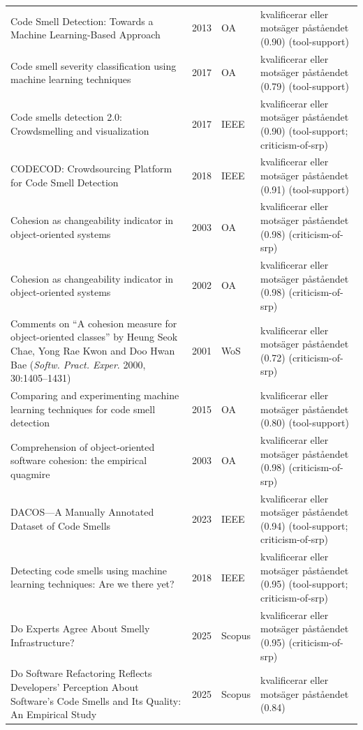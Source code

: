 \begin{longtable}{@{}%
  >{\raggedright\arraybackslash}p{}c%
  >{\raggedright\arraybackslash}p{}%
  >{\raggedright\arraybackslash}p{}@{}}
Code Smell Detection: Towards a Machine Learning-Based Approach & 2013 & OA & kvalificerar eller motsäger påståendet (0.90) (tool-support) \\
Code smell severity classification using machine learning techniques & 2017 & OA & kvalificerar eller motsäger påståendet (0.79) (tool-support) \\
Code smells detection 2.0: Crowdsmelling and visualization & 2017 & IEEE & kvalificerar eller motsäger påståendet (0.90) (tool-support; criticism-of-srp) \\
CODECOD: Crowdsourcing Platform for Code Smell Detection & 2018 & IEEE & kvalificerar eller motsäger påståendet (0.91) (tool-support) \\
Cohesion as changeability indicator in object-oriented systems & 2003 & OA & kvalificerar eller motsäger påståendet (0.98) (criticism-of-srp) \\
Cohesion as changeability indicator in object-oriented systems & 2002 & OA & kvalificerar eller motsäger påståendet (0.98) (criticism-of-srp) \\
Comments on \enquote{A cohesion measure for object-oriented classes} by Heung Seok Chae, Yong Rae Kwon and Doo Hwan Bae (\emph{Softw. Pract. Exper}. 2000, 30:1405--1431) & 2001 & WoS & kvalificerar eller motsäger påståendet (0.72) (criticism-of-srp) \\
Comparing and experimenting machine learning techniques for code smell detection & 2015 & OA & kvalificerar eller motsäger påståendet (0.80) (tool-support) \\
Comprehension of object-oriented software cohesion: the empirical quagmire & 2003 & OA & kvalificerar eller motsäger påståendet (0.98) (criticism-of-srp) \\
DACOS---A Manually Annotated Dataset of Code Smells & 2023 & IEEE & kvalificerar eller motsäger påståendet (0.94) (tool-support; criticism-of-srp) \\
Detecting code smells using machine learning techniques: Are we there yet? & 2018 & IEEE & kvalificerar eller motsäger påståendet (0.95) (tool-support; criticism-of-srp) \\
Do Experts Agree About Smelly Infrastructure? & 2025 & Scopus & kvalificerar eller motsäger påståendet (0.95) (criticism-of-srp) \\
Do Software Refactoring Reflects Developers' Perception About Software's Code Smells and Its Quality: An Empirical Study & 2025 & Scopus & kvalificerar eller motsäger påståendet (0.84) \\

\end{longtable}
